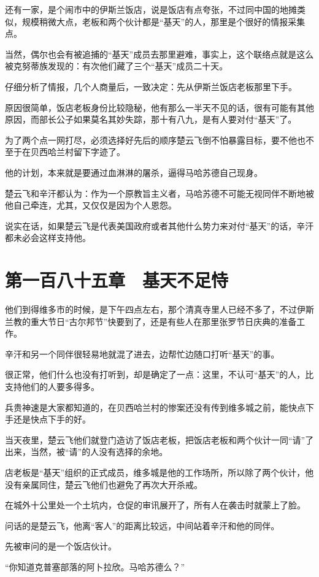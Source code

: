还有一家，是个闹市中的伊斯兰饭店，说是饭店有点夸张，不过同中国的地摊类似，规模稍微大点，老板和两个伙计都是“基天”的人，那里是个很好的情报采集点。

当然，偶尔也会有被追捕的“基天”成员去那里避难，事实上，这个联络点就是这么被克努蒂族发现的：有次他们藏了三个“基天”成员二十天。

仔细分析了情报，几个人商量后，一致决定：先从伊斯兰饭店老板那里下手。

原因很简单，饭店老板身份比较隐秘，他有那么一半天不见的话，很有可能有其他原因，而部长公子如果莫名其妙失踪，那十有八九，是有人要对付“基天”了。

为了两个点一网打尽，必须选择好先后的顺序楚云飞倒不怕暴露目标，要不他也不至于在贝西哈兰村留下字迹了。

他的计划，本来就是要通过血淋淋的屠杀，逼得马哈苏德自己现身。

楚云飞和辛汗都认为：作为一个原教旨主义者，马哈苏德不可能无视同伴不断地被他自己牵连，尤其，又仅仅是因为个人恩怨。

说实在话，如果楚云飞是代表美国政府或者其他什么势力来对付“基天”的话，辛汗都未必会这样支持他。

\section{第一百八十五章　基天不足恃}

他们到得维多市的时候，是下午四点左右，那个清真寺里人已经不多了，不过伊斯兰教的重大节日“古尔邦节”快要到了，还是有些人在那里张罗节日庆典的准备工作。

辛汗和另一个同伴很轻易地就混了进去，边帮忙边随口打听“基天”的事。

很正常，他们什么也没有打听到，却是确定了一点：这里，不认可“基天”的人，比支持他们的人要多得多。

兵贵神速是大家都知道的，在贝西哈兰村的惨案还没有传到维多城之前，能快点下手还是快点下手的好。

当天夜里，楚云飞他们就登门造访了饭店老板，把饭店老板和两个伙计一同“请”了出来，当然，被“请”的人没有选择的余地。

店老板是“基天”组织的正式成员，维多城是他的工作场所，所以除了两个伙计，他没有亲属同住，楚云飞他们也避免了再次大开杀戒。

在城外十公里处一个土坑内，仓促的审讯展开了，所有人在袭击时就蒙上了脸。

问话的是楚云飞，他离“客人”的距离比较远，中间站着辛汗和他的同伴。

先被审问的是一个饭店伙计。

“你知道克普塞部落的阿卜拉欣。马哈苏德么？”

